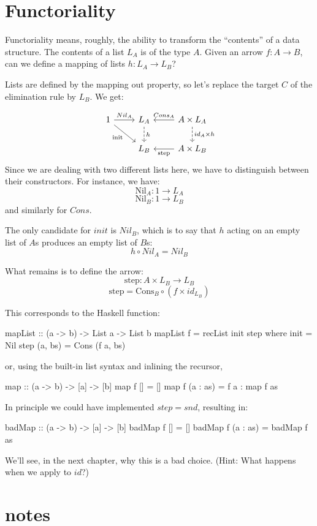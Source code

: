 \documentclass[DaoFP]{subfiles}
\begin{document}
\section{Functoriality}

Functoriality means, roughly, the ability to transform the ``contents'' of a data structure. The contents of a list $L_A$ is of the type $A$. Given an arrow $f \colon A \to B$, can we define a mapping of lists $h \colon L_A \to L_B$?

Lists are defined by the mapping out property, so let's replace the target $C$ of the elimination rule by $L_B$. We get:

\[
 \begin{tikzcd}
 1
 \arrow[r, "Nil_A"]
 \arrow[rd, "\text{init}"']
 &L_A
\arrow[d, dashed, "h"]
&A \times L_A
  \arrow[l, "Cons_A"']
\arrow[d, dashed, "id_A \times h"]
\\
& L_B
& A \times L_B
\arrow[l, "\text{step}"]
  \end{tikzcd}
\]
Since we are dealing with two different lists here, we have to distinguish between their constructors. For instance, we have: 
\[\text{Nil}_A \colon 1 \to L_A \]
\[\text{Nil}_B \colon 1 \to L_B \]
and similarly for $Cons$.

The only candidate for $init$ is $Nil_B$, which is to say that $h$ acting on an empty list of $A$s produces an empty list of $B$s:
\[ h \circ Nil_A = Nil_B \]

What remains is to define the arrow:
\[\text{step} \colon A \times L_B \to L_B\]
\[ \text{step} = \text{Cons}_B \circ (f \times id_{L_B}) \]

This corresponds to the Haskell function:

\begin{haskell}
mapList :: (a -> b) -> List a -> List b
mapList f = recList init step
  where
    init = Nil
    step (a, bs) = Cons (f a, bs)
\end{haskell}
or, using the built-in list syntax and inlining the recursor,
\begin{haskell}
map :: (a -> b) -> [a] -> [b]
map f [] = []
map f (a : as) = f a : map f as
\end{haskell}

In principle we could have implemented $step = snd$, resulting in:
\begin{haskell}
badMap :: (a -> b) -> [a] -> [b]
badMap f [] = []
badMap f (a : as) = badMap f as
\end{haskell}
We'll see, in the next chapter, why this is a bad choice. (Hint: What happens when we apply  to $id$?)

\section{notes}


\begin{exercise}
\end{exercise}
\begin{haskell}
\end{haskell}
\end{document}
